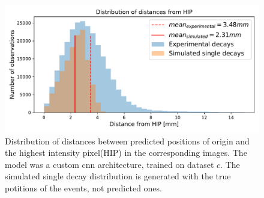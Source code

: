 \begin{figure}
\centering
\includegraphics[width=\textwidth]{chapters/results/figures/experimental_pos_dist.pdf}
\caption{\label{fig:experimental-pos-dist} Distribution of distances between predicted
positions of origin and the highest intensity pixel(HIP) in the corresponding images. 
The model was a custom cnn architecture, trained on dataset $c$. The simulated single
decay distribution is generated with the true potitions of the events, not
predicted ones.}
\end{figure}